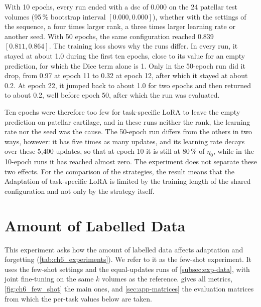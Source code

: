 With 10 epochs, every run ended with a \gls{dsc} of 0.000 on the 24 patellar test volumes (95\,\% bootstrap interval $[0.000, 0.000]$), whether with the settings of the sequence, a four times larger rank, a three times larger learning rate or another seed.
With 50 epochs, the same configuration reached 0.839 $[0.811, 0.864]$.
The training loss shows why the runs differ.
In every run, it stayed at about 1.0 during the first ten epochs, close to its value for an empty prediction, for which the Dice term alone is 1.
Only in the 50-epoch run did it drop, from 0.97 at epoch 11 to 0.32 at epoch 12, after which it stayed at about 0.2.
At epoch 22, it jumped back to about 1.0 for two epochs and then returned to about 0.2, well before epoch 50, after which the run was evaluated.

Ten epochs were therefore too few for task-specific LoRA to leave the empty prediction on patellar cartilage, and in these runs neither the rank, the learning rate nor the seed was the cause.
The 50-epoch run differs from the others in two ways, however: it has five times as many updates, and its learning rate decays over these 5{,}400 updates, so that at epoch 10 it is still at 80\,\% of $\eta_0$, while in the 10-epoch runs it has reached almost zero.
The experiment does not separate these two effects.
For the comparison of the strategies, the result means that the Adaptation of task-specific LoRA is limited by the training length of the shared configuration and not only by the strategy itself.

\section{Amount of Labelled Data}
\label{sec:exp-few-shot}
This experiment asks how the amount of labelled data affects adaptation and forgetting (\cref{tab:ch6_experiments}).
We refer to it as the few-shot experiment.
It uses the few-shot settings and the equal-updates runs of \cref{subsec:exp-data}, with joint fine-tuning on the same $k$ volumes as the reference.
 gives all metrics, \cref{fig:ch6_few_shot} the main ones, and \cref{sec:app-matrices} the evaluation matrices from which the per-task values below are taken.

